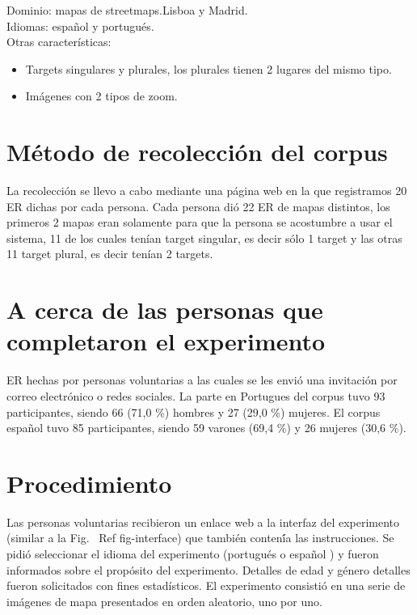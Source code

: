 Dominio: mapas de streetmaps.Lisboa y Madrid.\\
Idiomas: espa\~nol y portugu\'es.\\

Otras caracter\'{i}sticas: 
\begin{itemize}

\item Targets singulares y plurales, los plurales tienen 2 lugares del mismo tipo.
\item Im\'agenes con 2 tipos de zoom.

\end{itemize}


\section{M\'etodo de recolecci\'on del corpus}

La recolecci\'on se llevo a cabo mediante una p\'agina web en la que registramos 20 ER dichas por cada persona. Cada persona di\'o 22 ER de mapas distintos, los primeros 2 mapas eran solamente para que la persona se acostumbre a usar el sistema, 11 de los cuales ten\'{i}an target singular, es decir s\'olo 1 target y las otras 11 target plural, es decir ten\'{i}an 2 targets.

\section{A cerca de las personas que completaron el experimento}


ER hechas por personas voluntarias a las cuales se les envi\'o una invitaci\'on por correo electr\'onico o redes sociales. La parte en Portugues del corpus tuvo 93 participantes, siendo 66 (71,0 \%) hombres y 27 (29,0 \%) mujeres. El corpus espa\~nol tuvo 85 participantes, siendo 59 varones (69,4 \%) y 26 mujeres (30,6 \%).
\section{Procedimiento}

Las personas voluntarias recibieron un enlace web a la interfaz del experimento (similar a la Fig. \ Ref {fig-interface}) que tambi\'en conten\'{í}a las instrucciones. Se pidi\'o seleccionar el idioma del experimento (portugu\'es o espa\~nol ) y fueron informados sobre el prop\'osito del experimento. Detalles de edad y g\'enero detalles fueron solicitados con fines estad\'{i}sticos. El experimento consisti\'o en una serie de im\'agenes de mapa presentados en orden aleatorio, uno por uno.


